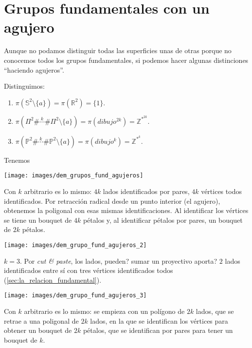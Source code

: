 \section{Grupos fundamentales con un agujero}%
\label{sec:grupos_fundamentales_con_un_agujero}
Aunque no podamos distinguir todas las superficies unas de otras porque no conocemos todos los grupos fundamentales, si podemos hacer algunas distinciones ``haciendo agujeros''.

\begin{prop}
Distinguimos:
\begin{enumerate}
    \item $\pi\left( \mathbb{S}^{2} \setminus \{a\} \right) = \pi\left( \mathbb{R}^{2} \right) = \{1\}$.
    \item $\pi\left( \Pi^2 \# \stackrel{k}{\cdots} \# \Pi^2 \setminus \{a\} \right) = \pi\left( dibujo^{2k}  \right) = \mathbb{Z}^{*^{2k}}$.
    \item $\pi\left( \mathbb{P}^{2} \# \stackrel{k}{\cdots} \# \mathbb{P}^{2} \setminus \{a\} \right) = \pi\left( dibujo^{k} \right) = \mathbb{Z}^{*^{k}}$.
\end{enumerate}
\end{prop}
\begin{demo}
Tenemos
\begin{center}
    \texttt{[image: images/dem\_grupos\_fund\_agujeros]} 
\end{center}
\end{demo}

Con $k$ arbitrario es lo mismo: $4k$ lados identificados por pares, $4k$ vértices todos identificados. Por retracción radical desde un punto interior (el agujero), obtenemos la poligonal con esas mismas identificaciones. Al identificar los vértices se tiene un bouquet de $4k$ pétalos y, al identificar pétalos por pares, un bouquet de $2k$ pétalos.
\begin{demo}
\begin{center}
    \texttt{[image: images/dem\_grupo\_fund\_agujeros\_2]} 
\end{center}    
$k = 3$. Por \textit{cut \& paste}, los lados, pueden? sumar un proyectivo aporta? $2$ lados identificados entre sí con tres vértices identificados todos (\ref{sec:la_relacion_fundamental}).
\begin{center}
    \texttt{[image: images/dem\_grupo\_fund\_agujeros\_3]} 
\end{center}
\end{demo}
Con $k$ arbitrario es lo mismo: se empieza con un polígono de $2k$ lados, que se retrae a una poligonal de $2k$ lados, en la que se identifican los vértices para obtener un bouquet de $2k$ pétalos, que se identifican por pares para tener un bouquet de $k$.

